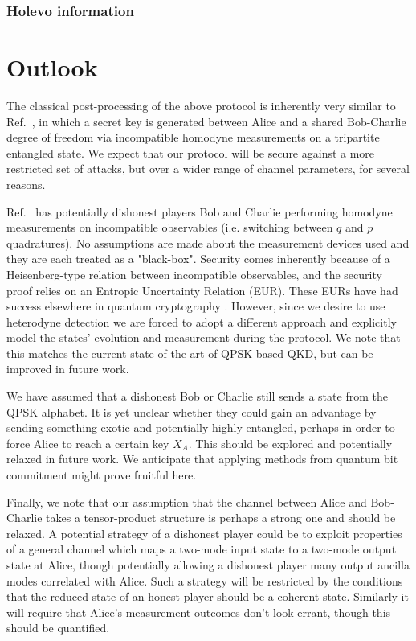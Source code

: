 \subsubsection{Holevo information}

















\section{Outlook}
The classical post-processing of the above protocol is inherently very similar to Ref.~\cite{Kogias2017}, in which a secret key is generated between Alice and a shared Bob-Charlie degree of freedom via incompatible homodyne measurements on a tripartite entangled state. We expect that our protocol will be secure against a more restricted set of attacks, but over a wider range of channel parameters, for several reasons. 

Ref.~\cite{Kogias2017} has potentially dishonest players Bob and Charlie performing homodyne measurements on incompatible observables (i.e. switching between $q$ and $p$ quadratures). No assumptions are made about the measurement devices used and they are each treated as a "black-box". Security comes inherently because of a Heisenberg-type relation between incompatible observables, and the security proof relies on an Entropic Uncertainty Relation (EUR). These EURs have had success elsewhere in quantum cryptography . However, since we desire to use heterodyne detection we are forced to adopt a different approach and explicitly model the states' evolution and measurement during the protocol. We note that this matches the current state-of-the-art of QPSK-based QKD, but can be improved in future work.

We have assumed that a dishonest Bob or Charlie still sends a state from the QPSK alphabet. It is yet unclear whether they could gain an advantage by sending something exotic and potentially highly entangled, perhaps in order to force Alice to reach a certain key $X_A$. This should be explored and potentially relaxed in future work. We anticipate that applying methods from quantum bit commitment might prove fruitful here. 

Finally, we note that our assumption that the channel between Alice and Bob-Charlie takes a tensor-product structure is perhaps a strong one and should be relaxed. A potential strategy of a dishonest player could be to exploit properties of a general channel which maps a two-mode input state to a two-mode output state at Alice, though potentially allowing a dishonest player many output ancilla modes correlated with Alice. Such a strategy will be restricted by the conditions that the reduced state of an honest player should be a coherent state. Similarly it will require that Alice's measurement outcomes don't look errant, though this should be quantified.
